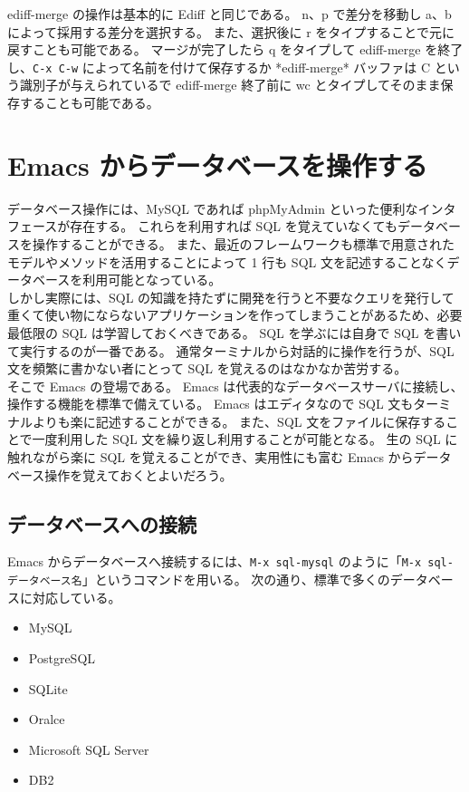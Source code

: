 ediff-merge の操作は基本的に Ediff と同じである。
n、p で差分を移動し a、b によって採用する差分を選択する。
また、選択後に r をタイプすることで元に戻すことも可能である。
マージが完了したら q をタイプして ediff-merge を終了し、\texttt{C-x C-w} によって名前を付けて保存するか *ediff-merge* バッファは C という識別子が与えられているで ediff-merge 終了前に wc とタイプしてそのまま保存することも可能である。
\section{Emacs からデータベースを操作する}
データベース操作には、MySQL であれば phpMyAdmin といった便利なインタフェースが存在する。
これらを利用すれば SQL を覚えていなくてもデータベースを操作することができる。
また、最近のフレームワークも標準で用意されたモデルやメソッドを活用することによって 1 行も SQL 文を記述することなくデータベースを利用可能となっている。\\

しかし実際には、SQL の知識を持たずに開発を行うと不要なクエリを発行して重くて使い物にならないアプリケーションを作ってしまうことがあるため、必要最低限の SQL は学習しておくべきである。
SQL を学ぶには自身で SQL を書いて実行するのが一番である。
通常ターミナルから対話的に操作を行うが、SQL 文を頻繁に書かない者にとって SQL を覚えるのはなかなか苦労する。\\

そこで Emacs の登場である。
Emacs は代表的なデータベースサーバに接続し、操作する機能を標準で備えている。
Emacs はエディタなので SQL 文もターミナルよりも楽に記述することができる。
また、SQL 文をファイルに保存することで一度利用した SQL 文を繰り返し利用することが可能となる。
生の SQL に触れながら楽に SQL を覚えることができ、実用性にも富む Emacs からデータベース操作を覚えておくとよいだろう。
\subsection{データベースへの接続}
Emacs からデータベースへ接続するには、\texttt{M-x sql-mysql} のように「\texttt{M-x sql-データベース名}」というコマンドを用いる。
次の通り、標準で多くのデータベースに対応している。
\begin{itemize}\setlength{\leftskip}{-1.00zw}%
\item MySQL
\item PostgreSQL
\item SQLite
\item Oralce
\item Microsoft SQL Server
\item DB2
\end{itemize}
